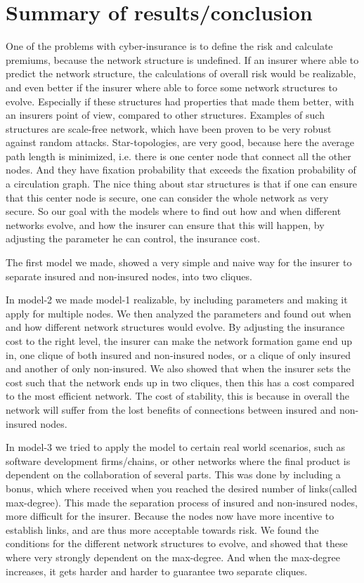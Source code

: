\chapter{Summary of results/conclusion}

One of the problems with cyber-insurance is to define the risk and calculate premiums, because the network structure is undefined. If an insurer where able to predict the network structure, the calculations of overall risk would be realizable, and even better if the insurer where able to force some network structures to evolve. Especially if these structures had properties that made them better, with an insurers point of view, compared to other structures. Examples of such structures are scale-free network, which have been proven to be very robust against random attacks. Star-topologies, are very good, because here the average path length is minimized, i.e. there is one center node that connect all the other nodes. And they have fixation probability that exceeds the fixation probability of a circulation graph. The nice thing about star structures is that if one can ensure that this center node is secure, one can consider the whole network as very secure. 
So our goal with the models where to find out how and when different networks evolve, and how the insurer can ensure that this will happen, by adjusting the parameter he can control, the insurance cost. 

The first model we made, showed a very simple and naive way for the insurer to separate insured and non-insured nodes, into two cliques. 

 In model-2 we made model-1 realizable, by including parameters and making it apply for multiple nodes. We then analyzed the parameters and found out when and how different network structures would evolve. By adjusting the insurance cost to the right level, the insurer can make the network formation game end up in, one clique of both insured and non-insured nodes, or a clique of only insured and another of only non-insured. 
We also showed that when the insurer sets the cost such that the network ends up in two cliques, then this has a cost compared to the most efficient network. The cost of stability, this is because in overall the network will suffer from the lost benefits of connections between insured and non-insured nodes.

In model-3 we tried to apply the model to certain real world scenarios, such as software development firms/chains, or other networks where the final product is dependent on the collaboration of several parts.
This was done by including a bonus, which where received when you reached the desired number of links(called max-degree). This made the separation process of insured and non-insured nodes, more difficult for the insurer. Because the nodes now have more incentive to establish links, and are thus more acceptable towards risk. We found the conditions for the different network structures to evolve, and showed that these where very strongly dependent on the max-degree. And when the max-degree increases, it gets harder and harder to guarantee two separate cliques. 


